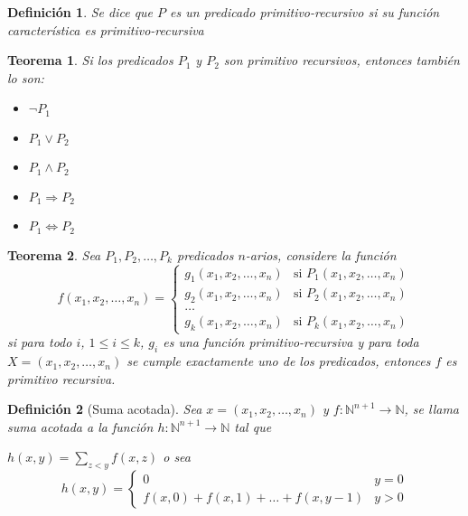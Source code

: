 \documentclass[a4paper,1pt]{report}
\newtheorem*{teo}{Teorema}
\newtheorem*{dfn}{Definición}
\begin{document}
\begin{dfn}
 Se dice que $P$ es un predicado primitivo-recursivo si su función característica es primitivo-recursiva
\end{dfn}

\begin{teo}
 Si los predicados $P_1$ y $P_2$ son primitivo recursivos, entonces también lo son:
 \begin{itemize}
  \item $\neg P_1$
  \item $P_1\vee P_2$
  \item $P_1\wedge P_2$
  \item $P_1\Rightarrow P_2$
  \item $P_1\Leftrightarrow P_2$
 \end{itemize}

\end{teo}

\begin{teo}
 Sea $P_1,P_2,\dots,P_k$ predicados $n$-arios, considere la función
 \begin{equation}
f(x_1,x_2,\dots,x_n) = 
\begin{cases}
g_1(x_1,x_2,\dots,x_n) & \text{si } P_1(x_1,x_2,\dots,x_n) \\
g_2(x_1,x_2,\dots,x_n) & \text{si } P_2(x_1,x_2,\dots,x_n) \\
\dots\\
g_k(x_1,x_2,\dots,x_n) & \text{si } P_k(x_1,x_2,\dots,x_n) 
\end{cases}
\end{equation}
 si para todo $i$, $1\leq i \leq k$, $g_i$ es una función primitivo-recursiva y para toda $ X = (x_1,x_2,\dots,x_n)$ se cumple exactamente uno de los predicados, entonces $f$ es primitivo recursiva.
\end{teo}

\begin{dfn}[Suma acotada]
 Sea $x=(x_1,x_2,\dots,x_n)$ y $f:\mathbb{N}^{n+1}\rightarrow\mathbb{N}$, se llama suma acotada a la función $h:\mathbb{N}^{n+1}\rightarrow\mathbb{N}$ tal que 
 
 $h(x,y)=\sum_{z<y}f(x,z)$ o sea
 \begin{equation}
h(x,y) = 
\begin{cases}
0 & y=0 \\
f(x,0) + f(x,1) + \dots + f(x,y-1) & y>0 
\end{cases}
\end{equation}
\end{dfn}
\end{document}
